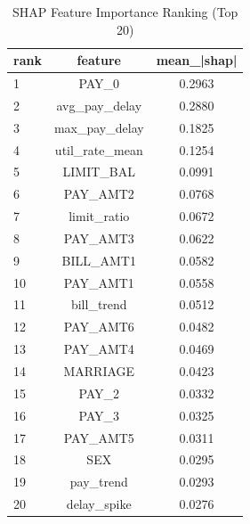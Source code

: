 \begin{table}
\centering
\caption{SHAP Feature Importance Ranking (Top 20)}
\label{tab:shap_ranking}
\begin{tabular}{lcc}
\toprule
rank & feature & mean_|shap| \\
\midrule
1 & PAY_0 & 0.2963 \\
2 & avg_pay_delay & 0.2880 \\
3 & max_pay_delay & 0.1825 \\
4 & util_rate_mean & 0.1254 \\
5 & LIMIT_BAL & 0.0991 \\
6 & PAY_AMT2 & 0.0768 \\
7 & limit_ratio & 0.0672 \\
8 & PAY_AMT3 & 0.0622 \\
9 & BILL_AMT1 & 0.0582 \\
10 & PAY_AMT1 & 0.0558 \\
11 & bill_trend & 0.0512 \\
12 & PAY_AMT6 & 0.0482 \\
13 & PAY_AMT4 & 0.0469 \\
14 & MARRIAGE & 0.0423 \\
15 & PAY_2 & 0.0332 \\
16 & PAY_3 & 0.0325 \\
17 & PAY_AMT5 & 0.0311 \\
18 & SEX & 0.0295 \\
19 & pay_trend & 0.0293 \\
20 & delay_spike & 0.0276 \\
\bottomrule
\end{tabular}
\end{table}

